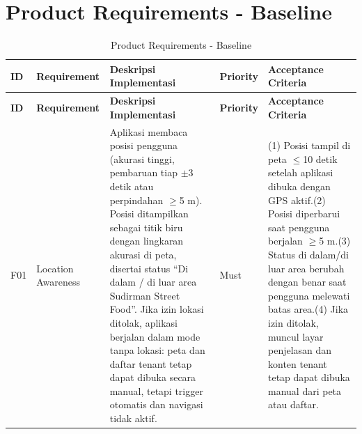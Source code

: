 \chapter{Product Requirements - Baseline}
\label{bab:product-requirements-baseline}
\begin{longtable}{|L{0.075}|L{0.226}|L{0.299}|L{0.093}|L{0.307}|}
\caption{Product Requirements - Baseline}\\
\hline
{}\textbf{ID} & \textbf{Requirement} & \textbf{Deskripsi Implementasi} & \textbf{Priority} & \textbf{Acceptance Criteria} \\ \hline
\endfirsthead
\hline
{}\textbf{ID} & \textbf{Requirement} & \textbf{Deskripsi Implementasi} & \textbf{Priority} & \textbf{Acceptance Criteria} \\ \hline
\endhead
F01 & Location Awareness & Aplikasi membaca posisi pengguna (akurasi tinggi, pembaruan tiap \(\pm\)3 detik atau perpindahan \(\ge\)5 m). Posisi ditampilkan sebagai titik biru dengan lingkaran akurasi di peta, disertai status ``Di dalam / di luar area Sudirman Street Food''. Jika izin lokasi ditolak, aplikasi berjalan dalam mode tanpa lokasi: peta dan daftar tenant tetap dapat dibuka secara manual, tetapi trigger otomatis dan navigasi tidak aktif. & Must & (1) Posisi tampil di peta \(\le\)10 detik setelah aplikasi dibuka dengan GPS aktif.\newline (2) Posisi diperbarui saat pengguna berjalan \(\ge\)5 m.\newline (3) Status di dalam/di luar area berubah dengan benar saat pengguna melewati batas area.\newline (4) Jika izin ditolak, muncul layar penjelasan dan konten tenant tetap dapat dibuka manual dari peta atau daftar. \\ \hline

\end{longtable}
